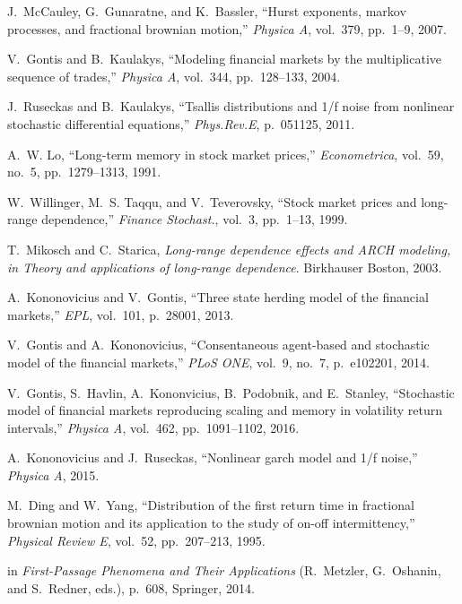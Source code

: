 \documentclass{article}
\begin{document}
\begin{thebibliography}{10}
J.~McCauley, G.~Gunaratne, and K.~Bassler, ``Hurst exponents, markov processes,
  and fractional brownian motion,'' {\em Physica A}, vol.~379, pp.~1--9, 2007.

V.~Gontis and B.~Kaulakys, ``Modeling financial markets by the multiplicative
  sequence of trades,'' {\em Physica A}, vol.~344, pp.~128--133, 2004.

J.~Ruseckas and B.~Kaulakys, ``Tsallis distributions and 1/f noise from
  nonlinear stochastic differential equations,'' {\em Phys.Rev.E}, p.~051125,
  2011.

A.~W. Lo, ``Long-term memory in stock market prices,'' {\em Econometrica},
  vol.~59, no.~5, pp.~1279--1313, 1991.

W.~Willinger, M.~S. Taqqu, and V.~Teverovsky, ``Stock market prices and
  long-range dependence,'' {\em Finance Stochast.}, vol.~3, pp.~1--13, 1999.

T.~Mikosch and C.~Starica, {\em Long-range dependence effects and ARCH
  modeling, in Theory and applications of long-range dependence}.
\newblock Birkhauser Boston, 2003.

A.~Kononovicius and V.~Gontis, ``Three state herding model of the financial
  markets,'' {\em EPL}, vol.~101, p.~28001, 2013.

V.~Gontis and A.~Kononovicius, ``Consentaneous agent-based and stochastic model
  of the financial markets,'' {\em PLoS ONE}, vol.~9, no.~7, p.~e102201, 2014.

V.~Gontis, S.~Havlin, A.~Kononvicius, B.~Podobnik, and E.~Stanley, ``Stochastic
  model of financial markets reproducing scaling and memory in volatility
  return intervals,'' {\em Physica A}, vol.~462, pp.~1091--1102, 2016.

A.~Kononovicius and J.~Ruseckas, ``Nonlinear garch model and 1/f noise,'' {\em
  Physica A}, 2015.

M.~Ding and W.~Yang, ``Distribution of the first return time in fractional
  brownian motion and its application to the study of on-off intermittency,''
  {\em Physical Review E}, vol.~52, pp.~207--213, 1995.

 in {\em First-Passage Phenomena and Their Applications} (R.~Metzler,
  G.~Oshanin, and S.~Redner, eds.), p.~608, Springer, 2014.


\end{thebibliography}
\end{document}
